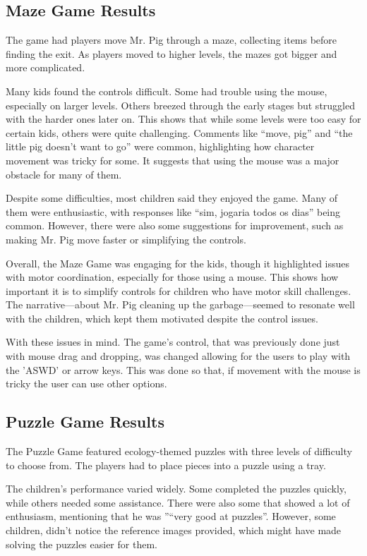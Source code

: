 \subsection{Maze Game Results}
The game had players move Mr. Pig through a maze, collecting items before finding the exit. As players moved to higher levels, the mazes got bigger and more complicated.

Many kids found the controls difficult. Some had trouble using the mouse, especially on larger levels. Others breezed through the early stages but struggled with the harder ones later on. This shows that while some levels were too easy for certain kids, others were quite challenging. Comments like “move, pig” and “the little pig doesn’t want to go” were common, highlighting how character movement was tricky for some. It suggests that using the mouse was a major obstacle for many of them.

Despite some difficulties, most children said they enjoyed the game. Many of them were enthusiastic, with responses like “sim, jogaria todos os dias” being common. However, there were also some suggestions for improvement, such as making Mr. Pig move faster or simplifying the controls.

Overall, the Maze Game was engaging for the kids, though it highlighted issues with motor coordination, especially for those using a mouse. This shows how important it is to simplify controls for children who have motor skill challenges. The narrative—about Mr. Pig cleaning up the garbage—seemed to resonate well with the children, which kept them motivated despite the control issues.

With these issues in mind. The game's control, that was previously done just with mouse drag and dropping, was changed allowing for the users to play with the 'ASWD' or arrow keys. This was done so that, if movement with the mouse is tricky the user can use other options.

\newpage
\subsection{Puzzle Game Results}

The Puzzle Game featured ecology-themed puzzles with three levels of difficulty to choose from. The players had to place pieces into a puzzle using a tray.


The children’s performance varied widely. Some completed the puzzles quickly, while others needed some assistance. There were also some that showed a lot of enthusiasm, mentioning that he was ''“very good at puzzles''. However, some children, didn’t notice the reference images provided, which might have made solving the puzzles easier for them.

